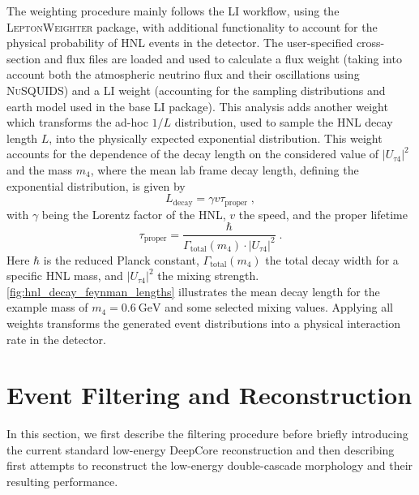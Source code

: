 \documentclass[
    aps,
    prd,
    reprint,
    amsmath,
    amssymb,
    nofootinbib,
    linenumbers,
    superscriptaddress,
    floatfix
]{revtex4-2}
\newcommand{\gev}{\giga\electronvolt}
\def\ut4{$|U_{\tau4}|^2$}
\begin{document}
The weighting procedure mainly follows the LI workflow, using the \textsc{LeptonWeighter} package, with additional functionality to account for the physical probability of HNL events in the detector.
The user-specified cross-section and flux files are loaded and used to calculate a flux weight (taking into account both the atmospheric neutrino flux and their oscillations using \textsc{NuSQUIDS}) and a LI weight (accounting for the sampling distributions and earth model used in the base LI package).
This analysis adds another weight which transforms the ad-hoc $1/L$ distribution, used to sample the HNL decay length $L$, into the physically expected exponential distribution.
This weight accounts for the dependence of the decay length on the considered value of \ut4 and the mass $m_4$, where the mean lab frame decay length, defining the exponential distribution, is given by
\begin{equation}
    L_\mathrm{decay} = \gamma v \tau_\mathrm{proper}
    \;,
    \label{eq:decay_length}
\end{equation}
with $\gamma$ being the Lorentz factor of the HNL, $v$ the speed, and the proper lifetime
\begin{equation}
    \tau_\mathrm{proper} = \frac{\hbar}{\Gamma_\mathrm{total}(m_4) \cdot |U_{\tau4}|^2}
    \;.
    \label{eq:proper_lifetime}
\end{equation}
Here $\hbar$ is the reduced Planck constant, $\Gamma_\mathrm{total}(m_4)$ the total decay width for a specific HNL mass, and \ut4 the mixing strength.
\cref{fig:hnl_decay_feynman_lengths} illustrates the mean decay length for the example mass of $m_4=\SI{0.6}{\gev}$ and some selected mixing values.
Applying all weights transforms the generated event distributions into a physical interaction rate in the detector.




\section{\label{sec:filter_and_reco}Event Filtering and Reconstruction}

In this section, we first describe the filtering procedure before briefly introducing the current standard low-energy DeepCore reconstruction and then describing first attempts to reconstruct the low-energy double-cascade morphology and their resulting performance.
\end{document}

